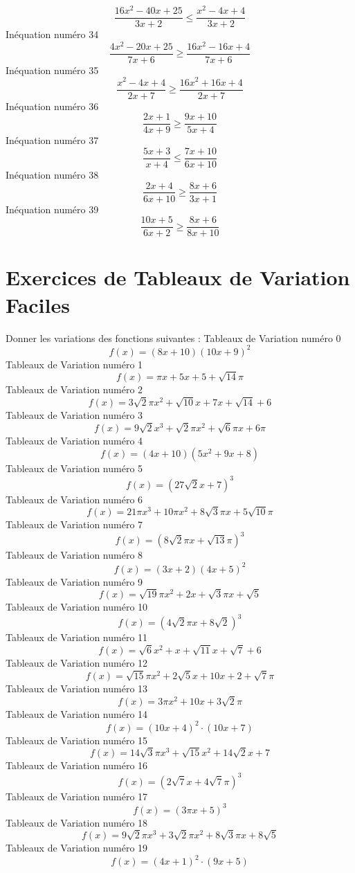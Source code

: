\documentclass{article}
\begin{document}
\[\frac{16 x^{2} - 40 x + 25}{3 x + 2} \leq \frac{x^{2} - 4 x + 4}{3 x + 2}\]In\'equation num\'ero 34 \[\frac{4 x^{2} - 20 x + 25}{7 x + 6} \geq \frac{16 x^{2} - 16 x + 4}{7 x + 6}\]In\'equation num\'ero 35 \[\frac{x^{2} - 4 x + 4}{2 x + 7} \geq \frac{16 x^{2} + 16 x + 4}{2 x + 7}\]In\'equation num\'ero 36 \[\frac{2 x + 1}{4 x + 9} \geq \frac{9 x + 10}{5 x + 4}\]In\'equation num\'ero 37 \[\frac{5 x + 3}{x + 4} \leq \frac{7 x + 10}{6 x + 10}\]In\'equation num\'ero 38 \[\frac{2 x + 4}{6 x + 10} \geq \frac{8 x + 6}{3 x + 1}\]In\'equation num\'ero 39 \[\frac{10 x + 5}{6 x + 2} \geq \frac{8 x + 6}{8 x + 10}\]
 \section{Exercices de Tableaux de Variation Faciles}

 Donner les variations des fonctions suivantes : 
Tableaux de Variation num\'ero 0 \[f(x) = \left(8 x + 10\right) \left(10 x + 9\right)^{2}\]Tableaux de Variation num\'ero 1 \[f(x) = \pi x + 5 x + 5 + \sqrt{14} \pi\]Tableaux de Variation num\'ero 2 \[f(x) = 3 \sqrt{2} \pi x^{2} + \sqrt{10} x + 7 x + \sqrt{14} + 6\]Tableaux de Variation num\'ero 3 \[f(x) = 9 \sqrt{2} x^{3} + \sqrt{2} \pi x^{2} + \sqrt{6} \pi x + 6 \pi\]Tableaux de Variation num\'ero 4 \[f(x) = \left(4 x + 10\right) \left(5 x^{2} + 9 x + 8\right)\]Tableaux de Variation num\'ero 5 \[f(x) = \left(27 \sqrt{2} x + 7\right)^{3}\]Tableaux de Variation num\'ero 6 \[f(x) = 21 \pi x^{3} + 10 \pi x^{2} + 8 \sqrt{3} \pi x + 5 \sqrt{10} \pi\]Tableaux de Variation num\'ero 7 \[f(x) = \left(8 \sqrt{2} \pi x + \sqrt{13} \pi\right)^{3}\]Tableaux de Variation num\'ero 8 \[f(x) = \left(3 x + 2\right) \left(4 x + 5\right)^{2}\]Tableaux de Variation num\'ero 9 \[f(x) = \sqrt{19} \pi x^{2} + 2 x + \sqrt{3} \pi x + \sqrt{5}\]Tableaux de Variation num\'ero 10 \[f(x) = \left(4 \sqrt{2} \pi x + 8 \sqrt{2}\right)^{3}\]Tableaux de Variation num\'ero 11 \[f(x) = \sqrt{6} x^{2} + x + \sqrt{11} x + \sqrt{7} + 6\]Tableaux de Variation num\'ero 12 \[f(x) = \sqrt{15} \pi x^{2} + 2 \sqrt{5} x + 10 x + 2 + \sqrt{7} \pi\]Tableaux de Variation num\'ero 13 \[f(x) = 3 \pi x^{2} + 10 x + 3 \sqrt{2} \pi\]Tableaux de Variation num\'ero 14 \[f(x) = \left(10 x + 4\right)^{2} \cdot \left(10 x + 7\right)\]Tableaux de Variation num\'ero 15 \[f(x) = 14 \sqrt{3} \pi x^{3} + \sqrt{15} x^{2} + 14 \sqrt{2} x + 7\]Tableaux de Variation num\'ero 16 \[f(x) = \left(2 \sqrt{7} x + 4 \sqrt{7} \pi\right)^{3}\]Tableaux de Variation num\'ero 17 \[f(x) = \left(3 \pi x + 5\right)^{3}\]Tableaux de Variation num\'ero 18 \[f(x) = 9 \sqrt{2} \pi x^{3} + 3 \sqrt{2} \pi x^{2} + 8 \sqrt{3} \pi x + 8 \sqrt{5}\]Tableaux de Variation num\'ero 19 \[f(x) = \left(4 x + 1\right)^{2} \cdot \left(9 x + 5\right)\]
\end{document}
